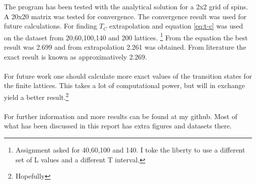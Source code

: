 The program has been tested with the analytical solution for a 2x2 grid of spins. A 20x20 matrix was tested for convergence. The convergence result was used for future calculations. For finding $T_C$ extrapolation and equation \ref{eq:t-c} was used on the dataset from 20,60,100,140 and 200 lattices. \footnote{Assignment asked for 40,60,100 and 140. I toke the liberty to use a different set of L values and a different T interval.} From the equation the best result was 2.699 and from extrapolation 2.261 was obtained. From literature the exact result is known as approximatively 2.269.\cite{onsager}  
\\
\\
For future work one should calculate more exact values of the transition states for the finite lattices. This takes a lot of computational power, but will in exchange yield a better result.\footnote{Hopefully}
\\
\\
For further information and more results can be found at my github. Most of what has been discussed in this report has extra figures and datasets there. 